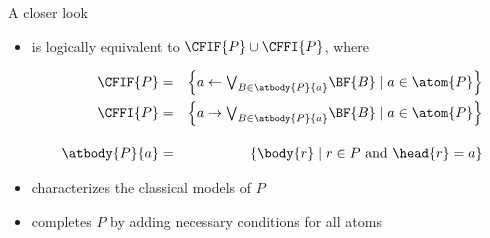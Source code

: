 \begin{frame}{A closer look}
  \bigskip
  \begin{itemize}
  \item {} is logically equivalent to $\CFIF{P}\cup\CFFI{P}$,
    where

    \begin{eqnarray*}
      \CFIF{P}
      & = &
      \left\{a \leftarrow \textstyle{\bigvee_{B\in\atbody{P}{a}}} \BF{B} \mid a\in\atom{P}\right\}
      \\
      \CFFI{P}
      & = &
      \left\{a \rightarrow \textstyle{\bigvee_{B\in\atbody{P}{a}}} \BF{B} \mid a\in\atom{P}\right\}
      \\[10pt]
      \atbody{P}{a}
      & = &
      \left\{\body{r} \mid r\in P\text{ and }\head{r}=a\right\}
    \end{eqnarray*}
    \medskip
  \item<2->  characterizes the classical models of $P$
  \item<2->  completes $P$ by adding necessary conditions for all atoms
\end{itemize}
\end{frame}
